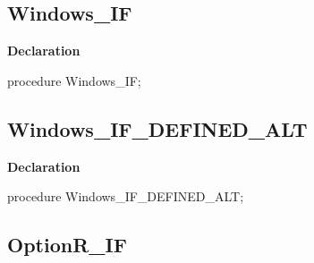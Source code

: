 \documentclass{report}
\newif\ifpdf
\begin{document}
\subsection*{Windows{\_}IF}
\fi
\label{ok_if_expressions-Windows_IF}
\begin{list}{}{
\setlength{\itemindent}{0cm}
\setlength{\listparindent}{0cm}
\setlength{\leftmargin}{\evensidemargin}
\addtolength{\leftmargin}{\tmplength}
\settowidth{\labelsep}{X}
\addtolength{\leftmargin}{\labelsep}
\setlength{\labelwidth}{\tmplength}
}
\item[\textbf{Declaration}\hfill]
\ifpdf
\begin{flushleft}
\fi
\begin{ttfamily}
procedure Windows{\_}IF;\end{ttfamily}

\ifpdf
\end{flushleft}
\fi

\end{list}
\ifpdf
\subsection*{\large{\textbf{Windows{\_}IF{\_}DEFINED{\_}ALT}}\normalsize\hspace{1ex}\hrulefill}
\else
\subsection*{Windows{\_}IF{\_}DEFINED{\_}ALT}
\fi
\label{ok_if_expressions-Windows_IF_DEFINED_ALT}
\begin{list}{}{
\setlength{\itemindent}{0cm}
\setlength{\listparindent}{0cm}
\setlength{\leftmargin}{\evensidemargin}
\addtolength{\leftmargin}{\tmplength}
\settowidth{\labelsep}{X}
\addtolength{\leftmargin}{\labelsep}
\setlength{\labelwidth}{\tmplength}
}
\item[\textbf{Declaration}\hfill]
\ifpdf
\begin{flushleft}
\fi
\begin{ttfamily}
procedure Windows{\_}IF{\_}DEFINED{\_}ALT;\end{ttfamily}

\ifpdf
\end{flushleft}
\fi

\end{list}
\ifpdf
\subsection*{\large{\textbf{OptionR{\_}IF}}\normalsize\hspace{1ex}\hrulefill}
\else
\end{document}
